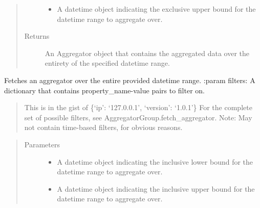 \documentclass[letterpaper,10pt,english]{sphinxmanual}
\begin{document}
\begin{fulllineitems}
\begin{fulllineitems}
\begin{quote}
\begin{description}
\begin{itemize}
\item {} 
 \textendash{} A datetime object indicating the exclusive upper bound for the datetime range to
aggregate over.

\end{itemize}

\item[{Returns}] \leavevmode
An Aggregator object that contains the aggregated data over the entirety of the specified datetime
range.

\end{description}\end{quote}

\end{fulllineitems}


\begin{fulllineitems}
\label{\detokenize{pydash_app.dashboard.aggregator.aggregator_group:pydash_app.dashboard.aggregator.aggregator_group.AggregatorGroup.fetch_aggregator_inclusive_daterange}}
Fetches an aggregator over the entire provided datetime range.
:param filters: A dictionary that contains property\_name-value pairs to filter on.
\begin{quote}

This is in the gist of \{‘ip’: ‘127.0.0.1’, ‘version’: ‘1.0.1’\}
For the complete set of possible filters, see AggregatorGroup.fetch\_aggregator.
Note: May not contain time-based filters, for obvious reasons.
\end{quote}
\begin{quote}\begin{description}
\item[{Parameters}] \leavevmode\begin{itemize}
\item {} 
 \textendash{} A datetime object indicating the inclusive lower bound for the datetime range to
aggregate over.

\item {} 
 \textendash{} A datetime object indicating the inclusive upper bound for the datetime range to
aggregate over.


\end{itemize}
\end{description}
\end{quote}
\end{fulllineitems}
\end{fulllineitems}
\end{document}
